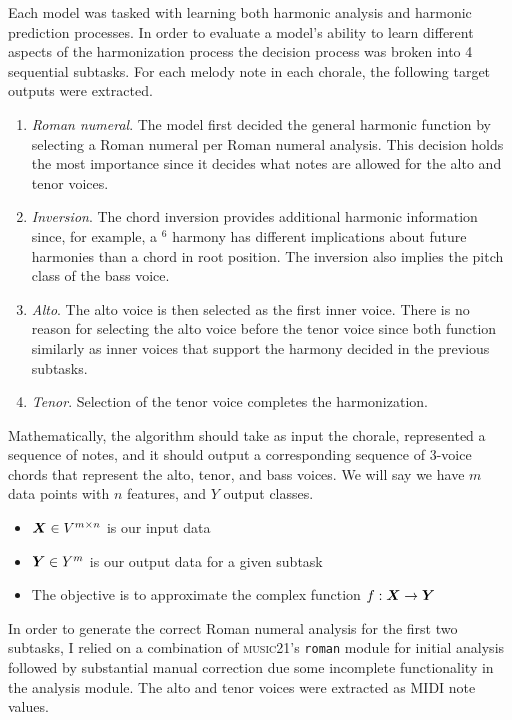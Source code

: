 \documentclass[11pt]{article}
\begin{document}
Each model was tasked with learning both harmonic analysis and harmonic prediction processes. In order to evaluate a model's ability to learn different aspects of the harmonization process the decision process was broken into 4 sequential subtasks. For each melody note in each chorale, the following target outputs were extracted.

\begin{enumerate}
\item \textit{Roman numeral}. The model first decided the general harmonic function by selecting a Roman numeral per Roman numeral analysis. This decision holds the most importance since it decides what notes are allowed for the alto and tenor voices.
\item \textit{Inversion}. The chord inversion provides additional harmonic information since, for example, a $^6$ harmony has different implications about future harmonies than a  chord in root position. The inversion also implies the pitch class of the bass voice.
\item \textit{Alto}. The alto voice is then selected as the first inner voice. There is no reason for selecting the alto voice before the tenor voice since both function similarly as inner voices that support the harmony decided in the previous subtasks.
\item \textit{Tenor}. Selection of the tenor voice completes the harmonization.
\end{enumerate}

Mathematically, the algorithm should take as input the chorale, represented a sequence of notes, and it should output a corresponding sequence of 3-voice chords that represent the alto, tenor, and bass voices. We will say we have $m$ data points with $n$ features, and $Y$ output classes.
\begin{itemize}
\item $\boldsymbol{X} \in V^{m \times n}$ is our input data
\item $\boldsymbol{Y} \in Y^m$ is our output data for a given subtask
\item The objective is to approximate the complex function $f: \boldsymbol{X} \to \boldsymbol{Y}$
\end{itemize}

In order to generate the correct Roman numeral analysis for the first two subtasks, I relied on a combination of \textsc{music21}'s \texttt{roman} module for initial analysis followed by substantial manual correction due some incomplete functionality in the analysis module. The alto and tenor voices were extracted as MIDI note values. \\
\end{document}
